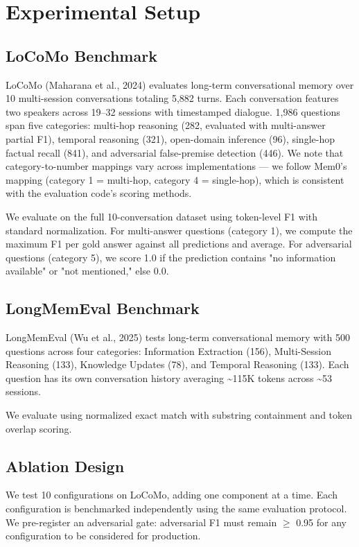 \documentclass[11pt]{article}
\begin{document}
\section{Experimental Setup}


\subsection{LoCoMo Benchmark}

LoCoMo (Maharana et al., 2024) evaluates long-term conversational memory over 10 multi-session conversations totaling 5,882 turns. Each conversation features two speakers across 19--32 sessions with timestamped dialogue. 1,986 questions span five categories: multi-hop reasoning (282, evaluated with multi-answer partial F1), temporal reasoning (321), open-domain inference (96), single-hop factual recall (841), and adversarial false-premise detection (446). We note that category-to-number mappings vary across implementations --- we follow Mem0's mapping (category 1 = multi-hop, category 4 = single-hop), which is consistent with the evaluation code's scoring methods.

We evaluate on the full 10-conversation dataset using token-level F1 with standard normalization. For multi-answer questions (category 1), we compute the maximum F1 per gold answer against all predictions and average. For adversarial questions (category 5), we score 1.0 if the prediction contains "no information available" or "not mentioned," else 0.0.


\subsection{LongMemEval Benchmark}

LongMemEval (Wu et al., 2025) tests long-term conversational memory with 500 questions across four categories: Information Extraction (156), Multi-Session Reasoning (133), Knowledge Updates (78), and Temporal Reasoning (133). Each question has its own conversation history averaging \textasciitilde 115K tokens across \textasciitilde 53 sessions.

We evaluate using normalized exact match with substring containment and token overlap scoring.


\subsection{Ablation Design}

We test 10 configurations on LoCoMo, adding one component at a time. Each configuration is benchmarked independently using the same evaluation protocol. We pre-register an adversarial gate: adversarial F1 must remain $\geq$ 0.95 for any configuration to be considered for production.
\end{document}
